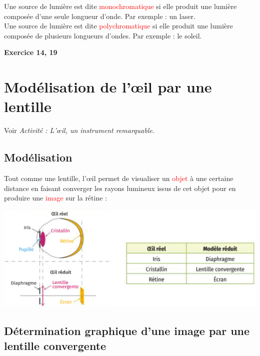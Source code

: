 \begin{tcolorbox}[colback=green!5!white,colframe=green!75!black,title=\textbf{Source monochromatique ou polychromatique:}]
Une source de lumière est dite \textcolor{red}{monochromatique} si elle produit une lumière composée d'une seule longueur d'onde. Par exemple : un laser.\\

Une source de lumière est dite \textcolor{red}{polychromatique} si elle produit une lumière composée de plusieurs longueurs d'ondes. Par exemple : le soleil.
\end{tcolorbox}

\begin{Large}
\end{Large}\textbf{Exercice 14, 19}
\section{Modélisation de l'\oe il par une lentille}
\begin{Large}
\end{Large}
Voir \textit{Activité : L'\oe il, un instrument remarquable}.

\subsection{Modélisation}
Tout comme une lentille, l'\oe il permet de visualiser un \textcolor{red}{objet} à une certaine distance en faisant converger les rayons lumineux issus de cet objet pour en produire une \textcolor{red}{image} sur la rétine :
\begin{center}
    \includegraphics[scale=0.5]{Images/Cours/Chapitre_4/Modele_oeil.PNG}
\end{center}

\subsection{Détermination graphique d'une image par une lentille convergente}

